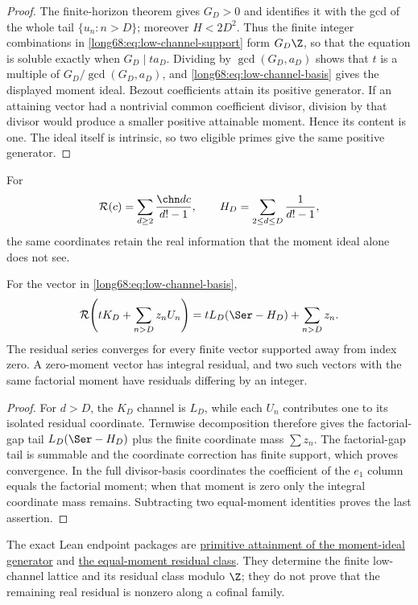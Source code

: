 \begin{proof}
The finite-horizon theorem gives $G_D>0$ and identifies it with the gcd of the
whole tail $\{u_n:n>D\}$; moreover $H<2D^2$.  Thus the finite integer
combinations in \eqref{long68:eq:low-channel-support} form $G_D\Z$, so that the
equation is soluble exactly when $G_D\mid ta_D$.  Dividing by
$\gcd(G_D,a_D)$ shows that $t$ is a multiple of
$G_D/\gcd(G_D,a_D)$, and \eqref{long68:eq:low-channel-basis} gives the displayed
moment ideal.  Bezout coefficients attain its positive generator.  If an
attaining vector had a nontrivial common coefficient divisor, division by that
divisor would produce a smaller positive attainable moment.  Hence its content
is one.  The ideal itself is intrinsic, so two eligible primes give the same
positive generator.
\end{proof}

For
\[
 \mathcal R(c)=\sum_{d\ge2}\frac{\chn dc}{d!-1},\qquad
 H_D=\sum_{2\le d\le D}\frac1{d!-1},
\]
the same coordinates retain the real information that the moment ideal alone
does not see.

\begin{theorem}\label{long68:res:residual-transparency}
For the vector in \eqref{long68:eq:low-channel-basis},
\[
 \mathcal R\!\left(tK_D+\sum_{n>D}z_nU_n\right)
 =tL_D(\Ser-H_D)+\sum_{n>D}z_n.
\]
The residual series converges for every finite vector supported away from
index zero.  A zero-moment vector has integral residual, and two such vectors
with the same factorial moment have residuals differing by an integer.
\end{theorem}

\begin{proof}
For $d>D$, the $K_D$ channel is $L_D$, while each $U_n$ contributes one to its
isolated residual coordinate.  Termwise decomposition therefore gives the
factorial-gap tail $L_D(\Ser-H_D)$ plus the finite coordinate mass
$\sum z_n$.  The factorial-gap tail is summable and the coordinate correction
has finite support, which proves convergence.  In the full divisor-basis
coordinates the coefficient of the $e_1$ column equals the factorial moment;
when that moment is zero only the integral coordinate mass remains.  Subtracting
two equal-moment identities proves the last assertion.
\end{proof}

The exact Lean endpoint packages are
\href{https://github.com/wcook04/plectis-erdos/blob/f20f727ae44d6dc3b24036bf63118b8fe591912e/ErdosProblems/Erdos68/PaperCompleteMomentIdeal.lean#L242}{primitive attainment of the moment-ideal generator} and
\href{https://github.com/wcook04/plectis-erdos/blob/f20f727ae44d6dc3b24036bf63118b8fe591912e/ErdosProblems/Erdos68/PaperCompleteResidualIdentity.lean#L195}{the equal-moment residual class}.
They determine the finite low-channel lattice and its residual class modulo
$\Z$; they do not prove that the remaining real residual is nonzero along a
cofinal family.

